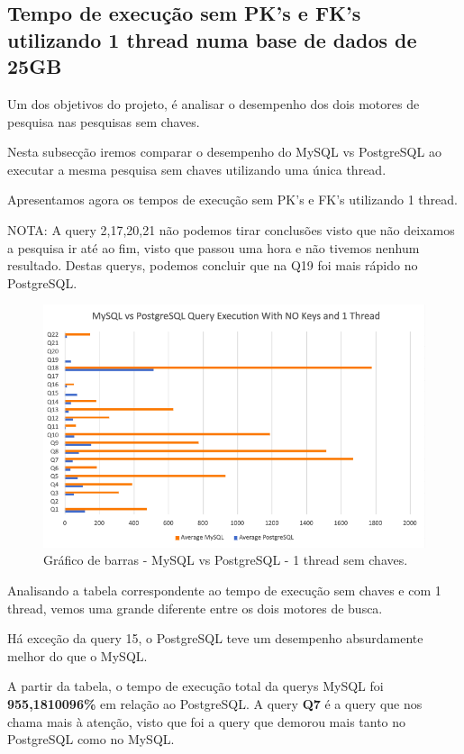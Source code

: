 \documentclass{article}
\begin{document}
\clearpage
\subsection{Tempo de execução sem PK's e FK's utilizando 1 thread numa base
de dados de 25GB}

Um dos objetivos do projeto, é analisar o desempenho dos dois motores de pesquisa nas pesquisas sem chaves.

Nesta subsecção iremos comparar o desempenho do MySQL vs PostgreSQL ao executar a mesma pesquisa sem chaves utilizando uma única thread.

Apresentamos agora os tempos de execução sem PK's e FK's utilizando 1 thread.

NOTA: A query 2,17,20,21 não podemos tirar conclusões visto que não deixamos a pesquisa ir até ao fim, visto que passou uma hora e não tivemos nenhum resultado. Destas querys, podemos concluir que na Q19 foi mais rápido no PostgreSQL.
\begin{figure}[H]
  \centering
  \includegraphics[width=\textwidth]{Graphs/mysqlvspostgres_withoutkeys_onethread.png}
  \caption{Gráfico de barras - MySQL vs PostgreSQL - 1 thread sem chaves.}
  \label{fig:PKCreation2}
\end{figure}

Analisando a tabela correspondente ao tempo de execução sem chaves e com 1 thread, vemos uma grande diferente entre os dois motores de busca.

Há exceção da query 15, o PostgreSQL teve um desempenho absurdamente melhor do que o MySQL.

A partir da tabela, o tempo de execução total da querys MySQL foi \textbf{955,1810096\%} em relação ao PostgreSQL. A query \textbf{Q7} é a query que nos chama mais à atenção, visto que foi a query que demorou mais tanto no PostgreSQL como no MySQL. \\
\end{document}
